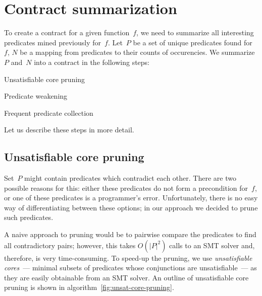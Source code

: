 \section{Contract summarization}\label{sec:summarization}

To create a contract for a given function~$f$, we need to summarize all interesting predicates mined previously for~$f$. Let~$P$ be a set of unique predicates found for~$f$, $N$ be a mapping from predicates to their counts of occurencies. We summarize~$P$ and~$N$ into a contract in the following steps:
%
\begin{itemize*}
\item Unsatisfiable core pruning
\item Predicate weakening
\item Frequent predicate collection
\end{itemize*}
%
Let us describe these steps in more detail.

\subsection{Unsatisfiable core pruning}

Set~$P$ might contain predicates which contradict each other. There are two possible reasons for this: either these predicates do not form a precondition for~$f$, or one of these predicates is a programmer's error. Unfortunately, there is no easy way of differentiating between these options; in our approach we decided to prune such predicates.

A naive approach to pruning would be to pairwise compare the predicates to find all contradictory pairs; however, this takes $O(|P|^2)$ calls to an SMT solver and, therefore, is very time-consuming. To speed-up the pruning, we use \emph{unsatisfiable cores}~--- minimal subsets of predicates whose conjunctions are unsatisfiable~--- as they are easily obtainable from an SMT solver. An outline of unsatisfiable core pruning is shown in algorithm~\ref{fig:unsat-core-pruning}.

